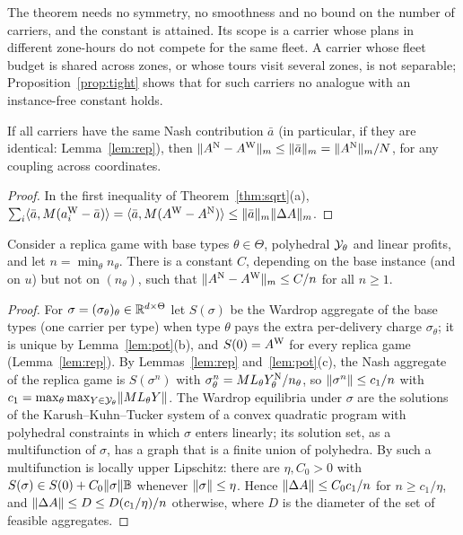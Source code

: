 The theorem needs no symmetry, no smoothness and no bound on the number of carriers, and the constant is attained. Its scope is a carrier whose plans in different zone-hours do not compete for the same fleet. A carrier whose fleet budget is shared across zones, or whose tours visit several zones, is not separable; Proposition~\ref{prop:tight} shows that for such carriers no analogue with an instance-free constant holds.

\begin{proposition}\label{prop:common}
If all carriers have the same Nash contribution $\bar a$ (in particular, if they are identical: Lemma~\ref{lem:rep}), then $\lVert A^{\mathrm{N}}-A^{\mathrm{W}}\rVert_m\le\lVert \bar a\rVert_m=\lVert A^{\mathrm{N}}\rVert_m/N$, for any coupling across coordinates.
\end{proposition}
\begin{proof}
In the first inequality of Theorem~\ref{thm:sqrt}(a), $\sum_i\langle \bar a,M(a_i^{\mathrm{W}}-\bar a)\rangle=\langle \bar a,M(A^{\mathrm{W}}-A^{\mathrm{N}})\rangle\le\lVert \bar a\rVert_m\lVert \Delta A\rVert_m$.
\end{proof}

\begin{theorem}\label{thm:rep}
Consider a replica game with base types $\theta\in\Theta$, polyhedral $\mathcal{Y}_\theta$ and linear profits, and let $n=\min_\theta n_\theta$. There is a constant $C$, depending on the base instance (and on $u$) but not on $(n_\theta)$, such that $\lVert A^{\mathrm{N}}-A^{\mathrm{W}}\rVert_m\le C/n$ for all $n\ge1$.
\end{theorem}
\begin{proof}
For $\sigma=(\sigma_\theta)_\theta\in\mathbb{R}^{d\times\Theta}$ let $S(\sigma)$ be the Wardrop aggregate of the base types (one carrier per type) when type $\theta$ pays the extra per-delivery charge $\sigma_\theta$; it is unique by Lemma~\ref{lem:pot}(b), and $S(0)=A^{\mathrm{W}}$ for every replica game (Lemma~\ref{lem:rep}). By Lemmas~\ref{lem:rep} and~\ref{lem:pot}(c), the Nash aggregate of the replica game is $S(\sigma^n)$ with $\sigma_\theta^n=ML_\theta Y_\theta^{\mathrm{N}}/n_\theta$, so $\lVert \sigma^n\rVert\le c_1/n$ with $c_1=\max_\theta\max_{Y\in\mathcal{Y}_\theta}\lVert ML_\theta Y\rVert$. The Wardrop equilibria under $\sigma$ are the solutions of the Karush--Kuhn--Tucker system of a convex quadratic program with polyhedral constraints in which $\sigma$ enters linearly; its solution set, as a multifunction of $\sigma$, has a graph that is a finite union of polyhedra. By \citet{Robinson1981} such a multifunction is locally upper Lipschitz: there are $\eta,C_0>0$ with $S(\sigma)\in S(0)+C_0\lVert \sigma\rVert\mathbb B$ whenever $\lVert \sigma\rVert\le\eta$. Hence $\lVert \Delta A\rVert\le C_0c_1/n$ for $n\ge c_1/\eta$, and $\lVert \Delta A\rVert\le D\le D(c_1/\eta)/n$ otherwise, where $D$ is the diameter of the set of feasible aggregates.
\end{proof}


